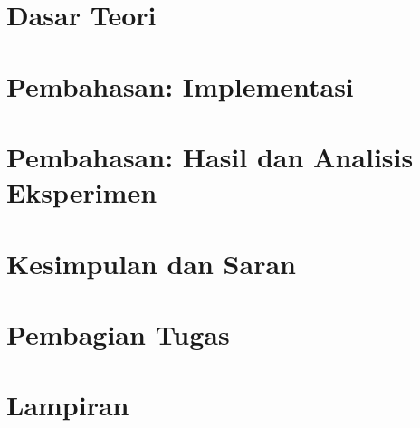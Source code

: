 \documentclass[12pt,a4paper]{report}
\begin{document}
	\chapter{Dasar Teori}
	

	\chapter{Pembahasan: Implementasi}
	

	\chapter{Pembahasan: Hasil dan Analisis Eksperimen}
	

	\chapter{Kesimpulan dan Saran}
	

	\chapter{Pembagian Tugas}
	

	

	\appendix
	\chapter{Lampiran}
	
\end{document}
